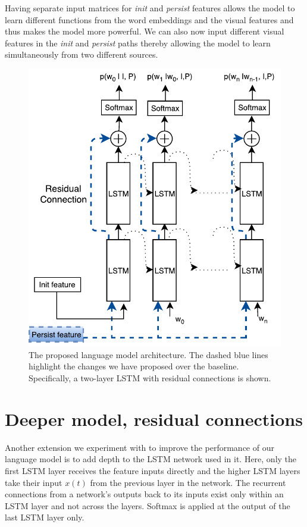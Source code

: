 Having separate input matrices for \emph{init} and \emph{persist} features
allows the model to learn different functions from the word embeddings and the
visual features and thus makes the model more powerful.
We can also now input different visual features in the \emph{init} and
\emph{persist} paths thereby allowing the model to learn simultaneously from two
different sources.

\begin{figure}[t]
\begin{center}
  \includegraphics[width=0.7\linewidth]{images/MultilayerResidualLSTM.pdf}
\end{center}
\vspace*{-4mm}
\caption{The proposed language model architecture. The dashed blue lines
        highlight the changes we have proposed over the baseline. 
        Specifically, a two-layer LSTM with residual connections is
        shown.}
\label{fig:proplstmlang}
\end{figure}

\section{Deeper model, residual connections }
Another extension we experiment with to improve the performance of our language
model is to add depth to the LSTM network used in it.
Here, only the first LSTM layer receives the feature inputs directly and the higher LSTM layers
take their input $x(t)$ from the previous layer in the network.
The recurrent connections from a network's outputs back to its inputs exist only
within an LSTM layer and not across the layers.
Softmax is applied at the output of the last LSTM layer only.

